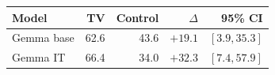 \begin{tabular}{lrrrr}
\toprule
Model & TV & Control & $\Delta$ & 95\% CI \\
\midrule
Gemma base & 62.6 & 43.6 & $+19.1$ & $[3.9,35.3]$ \\
Gemma IT & 66.4 & 34.0 & $+32.3$ & $[7.4,57.9]$ \\
\bottomrule
\end{tabular}
